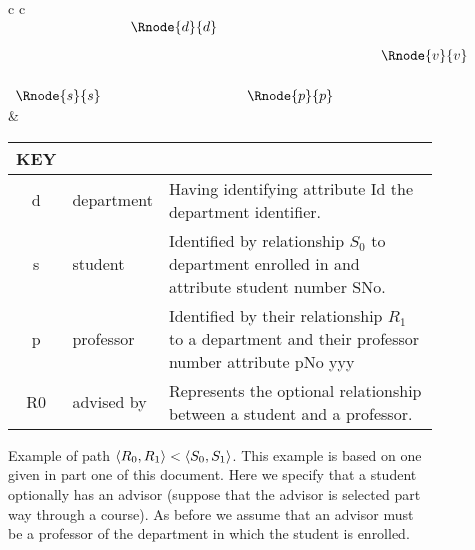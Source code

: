 \documentclass[10pt,a4paper]{article}
\begin{document}
\begin{figure} [H]  %
\begin{center}
\begin{tabular}{c c}
$
\begin{array}{cp{0.05cm}c  p{0.05cm}c p{0.5cm}c}
                & & \Rnode{d}{d} & &              & &             \\ [0.3cm]
								& &              & &              & & \Rnode{v}{v} \\ [0.6cm]     
	 \Rnode{s}{s} & &              & & \Rnode{p}{p} & &             
\end{array}
$
\idcomp
{} 
\idcomp
{} 
\idcomp
{} 
\idcomp
{} 
\idcomp
& \footnotesize
\begin{tabular}{c p{1.5cm} p{4cm}}
KEY && \\
\hline
d & department & Having identifying attribute Id the department identifier. \\
s & student & Identified by relationship $S_0$ to department enrolled in and  attribute student number SNo. \\
p & professor & Identified by their relationship $R_1$ to a department and their professor number attribute pNo yyy \\
R0 & advised by & Represents the optional relationship between a student and a professor.\\
\end{tabular} 
\end{tabular}
\end{center}
\caption{Example of path  $\langle R_0,R_1\rangle < \langle S_0,S_1\rangle$. This example is based on one given in part one of this document. Here we specify that a student optionally has an advisor (suppose that the advisor is selected part way through a course). As before we assume that an advisor must be a professor of the department in which the student is enrolled. }
\label{studentadvisorgraph}
\end{figure}
\end{document}
